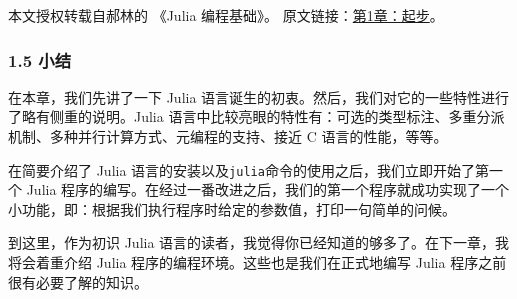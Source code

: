 
本文授权转载自郝林的 《Julia 编程基础》。 原文链接：\href{https://github.com/hyper0x/JuliaBasics/blob/master/book/ch01.md}{第1章：起步}。

\subsubsection{1.5 小结}

在本章，我们先讲了一下 Julia 语言诞生的初衷。然后，我们对它的一些特性进行了略有侧重的说明。Julia 语言中比较亮眼的特性有：可选的类型标注、多重分派机制、多种并行计算方式、元编程的支持、接近 C 语言的性能，等等。

在简要介绍了 Julia 语言的安装以及\verb`julia`命令的使用之后，我们立即开始了第一个 Julia 程序的编写。在经过一番改进之后，我们的第一个程序就成功实现了一个小功能，即：根据我们执行程序时给定的参数值，打印一句简单的问候。

到这里，作为初识 Julia 语言的读者，我觉得你已经知道的够多了。在下一章，我将会着重介绍 Julia 程序的编程环境。这些也是我们在正式地编写 Julia 程序之前很有必要了解的知识。
